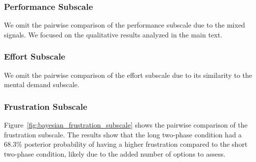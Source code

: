 \subsubsection{Performance Subscale}
We omit the pairwise comparison of the performance subscale due to the mixed signals. We focused on the qualitative results analyzed in the main text.

\subsubsection{Effort Subscale}
We omit the pairwise comparison of the effort subscale due to its similarity to the mental demand subscale. 

\subsubsection{Frustration Subscale}
Figure~\ref{fig:bayesian_frustration_subscale} shows the pairwise comparison of the frustration subscale. The results show that the long two-phase condition had a 68.3\% posterior probability of having a higher frustration compared to the short two-phase condition, likely due to the added number of options to assess. 

